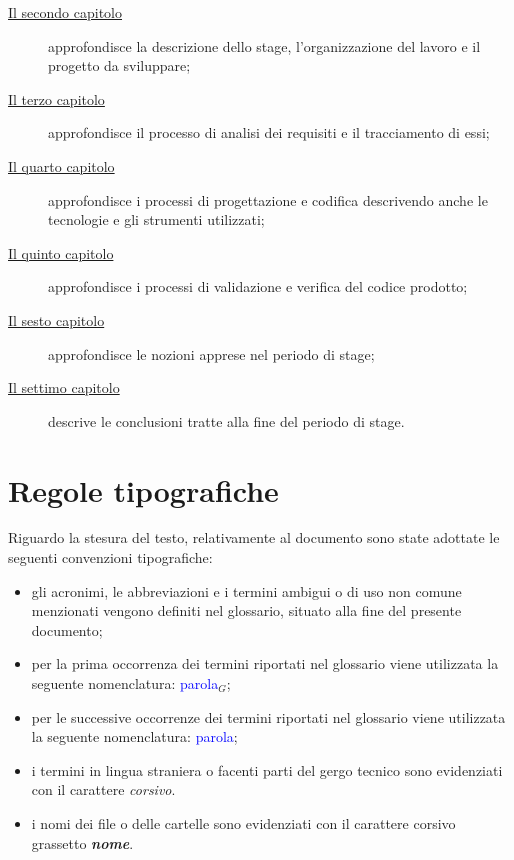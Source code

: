 \begin{description}
    \item[{\hyperref[cap:descrizione-stage]{Il secondo capitolo}}] approfondisce la descrizione dello stage, l'organizzazione del lavoro e il progetto da sviluppare;
    
    \item[{\hyperref[cap:analisi-requisiti]{Il terzo capitolo}}] approfondisce il processo di analisi dei requisiti e il tracciamento di essi;
    
    \item[{\hyperref[cap:progettazione-codifica]{Il quarto capitolo}}] approfondisce i processi di progettazione e codifica descrivendo anche le tecnologie e gli strumenti utilizzati;
    
    \item[{\hyperref[cap:verifica-validazione]{Il quinto capitolo}}] approfondisce i processi di validazione e verifica del codice prodotto;
    
     \item[{\hyperref[cap:nozioni-apprese]{Il sesto capitolo}}] approfondisce le nozioni apprese nel periodo di stage;
    
    \item[{\hyperref[cap:conclusioni]{Il settimo capitolo}}] descrive le conclusioni tratte alla fine del periodo di stage.
\end{description}

\section{Regole tipografiche}
\label{sec:regole-tipografiche}

Riguardo la stesura del testo, relativamente al documento sono state adottate le seguenti convenzioni tipografiche:
\begin{itemize}
	\item gli acronimi, le abbreviazioni e i termini ambigui o di uso non comune menzionati vengono definiti nel glossario, situato alla fine del presente documento;
	\item per la prima occorrenza dei termini riportati nel glossario viene utilizzata la seguente nomenclatura: \textcolor{blue}{parola}$_G$;
	\item per le successive occorrenze dei termini riportati nel glossario viene utilizzata la seguente nomenclatura: \textcolor{blue}{parola};
	\item i termini in lingua straniera o facenti parti del gergo tecnico sono evidenziati con il carattere \emph{corsivo}.
	\item i nomi dei file o delle cartelle sono evidenziati con il carattere corsivo grassetto \textbf{\textit{nome}}.
\end{itemize}